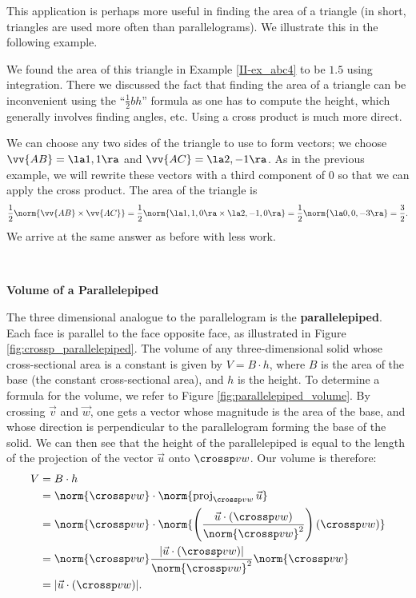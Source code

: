 This application is perhaps more useful in finding the area of a triangle (in short, triangles are used more often than parallelograms). We illustrate this in the following example.\\

{We found the area of this triangle in Example \ref{II-ex_abc4} to be $1.5$ using integration. There we discussed the fact that finding the area of a triangle can be inconvenient using the ``$\frac12bh$'' formula as one has to compute the height, which generally involves finding angles, etc. Using a cross product is much more direct.

We can choose any two sides of the triangle to use to form vectors; we choose $\vv{AB} = \la 1,1\ra$ and $\vv{AC}=\la 2,-1\ra$. As in the previous example, we will rewrite these vectors with a third component of 0 so that we can apply the cross product. The area of the triangle is
\[
\frac12\norm{\vv{AB}\times\vv{AC}} = \frac12\norm{\la 1,1,0\ra \times \la 2,-1,0\ra} = \frac12\norm{\la 0,0,-3\ra} = \frac32.
\]
We arrive at the same answer as before with less work.
}\\


\noindent\textbf{Volume of a Parallelepiped}

The three dimensional analogue to the parallelogram is the \textbf{parallelepiped}. Each face is parallel to the face opposite face, as illustrated in Figure \ref{fig:crossp_parallelepiped}. The volume of any three-dimensional solid whose cross-sectional area is a constant is given by $V=B\cdot h$, where $B$ is the area of the base (the constant cross-sectional area), and $h$ is the height. To determine a formula for the volume, we refer to Figure \ref{fig:parallelepiped_volume}. By crossing $\vec v$ and $\vec w$, one gets a vector whose magnitude is the area of the base, and whose direction is perpendicular to the parallelogram forming the base of the solid. We can then see that the height of the parallelepiped is equal to the length of the projection of the vector $\vec u$ onto $\crossp vw$. Our volume is therefore:
\begin{align*}
V & = B\cdot h\\
  & = \norm{\crossp vw}\cdot \norm{\operatorname{proj}_{\crossp vw}\vec{u}}\\
  & = \norm{\crossp vw}\cdot\norm{\left(\frac{\vec{u}\cdot(\crossp vw)}{\norm{\crossp vw}^2}\right)(\crossp vw)}\\
  & = \norm{\crossp vw}\frac{\lvert\vec{u}\cdot(\crossp vw)\rvert}{\norm{\crossp vw}^2}\norm{\crossp vw}\\
  & = \lvert\vec{u}\cdot(\crossp vw)\rvert.
\end{align*}

